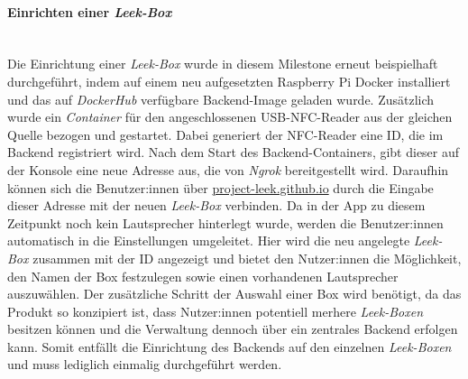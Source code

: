 \documentclass[10pt, a4paper]{article}
\begin{document}
\begin{onehalfspace}
\paragraph*{Einrichten einer \textit{Leek-Box}} $~$ \\
Die Einrichtung einer \textit{Leek-Box} wurde in diesem Milestone erneut beispielhaft durchgeführt, indem auf einem neu aufgesetzten Raspberry Pi Docker installiert
und das auf \textit{DockerHub} verfügbare Backend-Image geladen wurde. Zusätzlich wurde ein \textit{Container} für den angeschlossenen USB-NFC-Reader aus der gleichen Quelle bezogen und gestartet. Dabei
generiert der NFC-Reader eine ID, die im Backend registriert wird. Nach dem Start des Backend-Containers, gibt dieser auf der Konsole eine neue Adresse aus, die von \textit{Ngrok}
bereitgestellt wird. Daraufhin können sich die Benutzer:innen über \url{project-leek.github.io} durch die Eingabe dieser Adresse mit der neuen \textit{Leek-Box} verbinden. Da in der App zu diesem Zeitpunkt noch kein
Lautsprecher hinterlegt wurde, werden die Benutzer:innen automatisch in die Einstellungen umgeleitet. Hier wird die neu angelegte \textit{Leek-Box} zusammen mit der ID angezeigt und bietet den Nutzer:innen die Möglichkeit, den Namen
der Box festzulegen sowie einen vorhandenen Lautsprecher auszuwählen. Der zusätzliche Schritt der Auswahl einer Box wird benötigt, da das Produkt so konzipiert ist, dass Nutzer:innen potentiell merhere \textit{Leek-Boxen}
besitzen können und die Verwaltung dennoch über ein zentrales Backend erfolgen kann. Somit entfällt die Einrichtung des Backends auf den einzelnen \textit{Leek-Boxen} und muss lediglich einmalig durchgeführt werden.


\end{onehalfspace}
\end{document}
